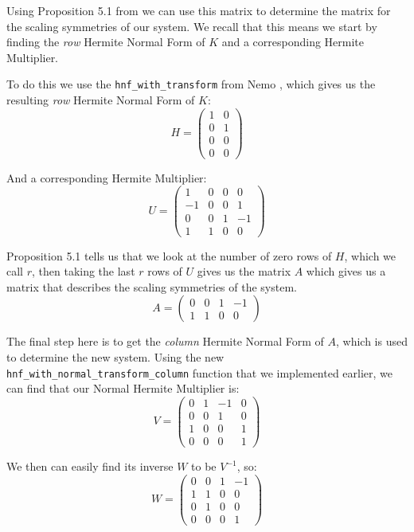 \documentclass[oneside, a4paper, onecolumn, 11pt]{article}
\begin{document}
Using Proposition 5.1 from \cite{Hubert2013} we can use this matrix to determine the matrix for the scaling symmetries of our system. We recall that this means we start by finding the \textit{row} Hermite Normal Form of \(K\) and a corresponding Hermite Multiplier.

To do this we use the \texttt{hnf\_with\_transform} from Nemo \cite{nemo}, which gives us the resulting \textit{row} Hermite Normal Form of \(K\):
\[
    H = \begin{pmatrix}
        1 & 0 \\
        0 & 1 \\
        0 & 0 \\
        0 & 0
    \end{pmatrix}
\]

And a corresponding Hermite Multiplier:
\[
    U = \begin{pmatrix}
        1  & 0 & 0 & 0  \\
        -1 & 0 & 0 & 1  \\
        0  & 0 & 1 & -1 \\
        1  & 1 & 0 & 0
    \end{pmatrix}
\]

Proposition 5.1 tells us that we look at the number of zero rows of \(H\), which we call \(r\), then taking the last \(r\) rows of \(U\) gives us the matrix \(A\) which gives us a matrix that describes the scaling symmetries of the system.
\[
    A = \begin{pmatrix}
        0 & 0 & 1 & -1 \\
        1 & 1 & 0 & 0
    \end{pmatrix}
\]


The final step here is to get the \textit{column} Hermite Normal Form of \(A\), which is used to determine the new system. Using the new \texttt{hnf\_with\_normal\_transform\_column} function that we implemented earlier, we can find that our Normal Hermite Multiplier is:
\[
    V = \begin{pmatrix}
        0 & 1 & -1 & 0 \\
        0 & 0 & 1  & 0 \\
        1 & 0 & 0  & 1 \\
        0 & 0 & 0  & 1
    \end{pmatrix}
\]

We then can easily find its inverse \(W\) to be \(V^{-1}\), so:
\[
    W = \begin{pmatrix}
        0 & 0 & 1 & -1 \\
        1 & 1 & 0 & 0  \\
        0 & 1 & 0 & 0  \\
        0 & 0 & 0 & 1
    \end{pmatrix}
\]
\end{document}
